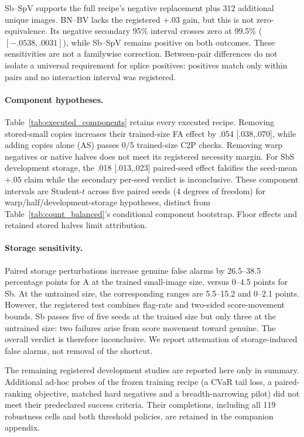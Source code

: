     Sb--SpV supports the full recipe's negative replacement plus 312 additional unique images. BN--BV lacks the registered $+.03$ gain, but this is not zero-equivalence. Its negative secondary 95\% interval crosses zero at 99.5\% ($[-.0538,.0031]$), while Sb--SpV remains positive on both outcomes. These sensitivities are not a familywise correction. Between-pair differences do not isolate a universal requirement for splice positives: positives match only within pairs and no interaction interval was registered.
    
    \paragraph{Component hypotheses.}
    Table~\ref{tab:executed_components} retains every executed recipe. Removing stored-small copies increases their trained-size FA effect by .054 [.038,.070], while adding copies alone (AS) passes 0/5 trained-size C2P checks. Removing warp negatives or native halves does not meet its registered necessity margin. For SbS development storage, the .018 [.013,.023] paired-seed effect falsifies the seed-mean $+.05$ claim while the secondary per-seed verdict is inconclusive. These component intervals are Student-$t$ across five paired seeds (4 degrees of freedom) for warp/half/development-storage hypotheses, distinct from Table~\ref{tab:count_balanced}'s conditional component bootstrap. Floor effects and retained stored halves limit attribution.
    
    \paragraph{Storage sensitivity.}
    Paired storage perturbations increase genuine false alarms by 26.5--38.5 percentage points for A at the trained small-image size, versus 0--4.5 points for Sb. At the untrained size, the corresponding ranges are 5.5--15.2 and 0--2.1 points. However, the registered test combines flag-rate and two-sided score-movement bounds. Sb passes five of five seeds at the trained size but only three at the untrained size: two failures arise from score movement toward genuine. The overall verdict is therefore inconclusive. We report attenuation of storage-induced false alarms, not removal of the shortcut.
    
    The remaining registered development studies are reported here only in summary. Additional ad-hoc probes of the frozen training recipe (a CVaR tail loss, a paired-ranking objective, matched hard negatives and a breadth-narrowing pilot) did not meet their predeclared success criteria. Their completions, including all 119 robustness cells and both threshold policies, are retained in the companion appendix.
    
